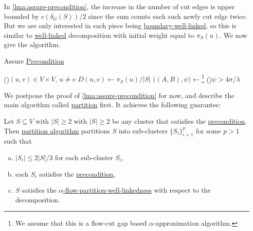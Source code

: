 In \autoref{lma:assure-precondition}, the increase in the number of cut edges is upper bounded by \(c(\delta _G(S)) / 2\) since the sum counts each such newly cut edge twice. But we are only interested in each piece being \hyperref[def:boundary-well-linked]{boundary-well-linked}, so this is similar to \hyperref[def:well-linked]{well-linked} decomposition with initial weight equal to \(\pi _S(u)\). We now give the algorithm.

\begin{algorithm}[H]\label{algo:assure-precondition}
	\DontPrintSemicolon{}
	\caption{Assure \hyperref[def:precondition]{Precondition}}

	\BlankLine
	\For(){\((u, v) \in V \times V\), \(u \neq v\)}{
		\(D(u, v)\gets \pi _S(u) / \lvert S \rvert \)\;
	}
	\;
	\(\big((A, B), \psi \big) \gets\)\footnote{We assume that this is a flow-cut gap based \(\alpha \)-approximation algorithm.}
	\;
	\uIf(){\(\psi > 4 \sigma / \lambda \)}{
		\;
	}
\end{algorithm}

We postpone the proof of \autoref{lma:assure-precondition} for now, and describe the main algorithm called \hyperref[algo:partition]{partition} first. It achieves the following guarantee:

\begin{lemma}\label{lma:partition}
	Let \(S \subseteq V\) with \(\lvert S \rvert \geq 2\) with \(\lvert S \rvert \geq 2\) be any cluster that satisfies the \hyperref[def:precondition]{precondition}. Then \hyperref[algo:partition]{partition algorithm} partitions \(S\) into sub-clusters \(\{ S_i \} _{i=1}^{p}\) for some \(p > 1\) such that
	\begin{enumerate}[(a)]
		\item \(\lvert S_i \rvert \leq 2 \lvert S \rvert / 3\) for each sub-cluster \(S_i\),
		\item each \(S_i\) satisfies the \hyperref[def:precondition]{precondition},
		\item \(S\) satisfies the \hyperref[def:partition-and-boundary-well-linked]{\(\alpha \)-flow-partition-well-linkedness} with respect to the decomposition.
	\end{enumerate}
\end{lemma}

